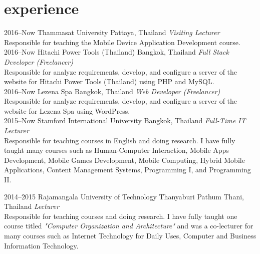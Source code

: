 \documentclass[]{friggeri-cv} %
\begin{document}

\section{experience}

\begin{entrylist}
\entry
{2016--Now}
{Thammasat University}
{Pattaya, Thailand}
{\emph{Visiting Lecturer} \\
Responsible for teaching the Mobile Device Application Development course. \\
}
\entry
{2016--Now}
{Hitachi Power Tools (Thailand)}
{Bangkok, Thailand}
{\emph{Full Stack Developer (Freelancer)} \\
Responsible for analyze requirements, develop, and configure a server of the website for Hitachi Power Tools (Thailand) using PHP and MySQL.\\
}
\entry
{2016--Now}
{Lezena Spa}
{Bangkok, Thailand}
{\emph{Web Developer (Freelancer)} \\
Responsible for analyze requirements, develop, and configure a server of the website for Lezena Spa using WordPress.\\
}
\entry
{2015--Now}
{Stamford International University}
{Bangkok, Thailand}
{\emph{Full-Time IT Lecturer} \\
Responsible for teaching courses in English and doing research. I have fully taught many courses such as Human-Computer Interaction, Mobile Apps Development, Mobile Games Development, Mobile Computing, Hybrid Mobile Applications, Content Management Systems, Programming I, and Programming II.\\
}

\entry
{2014--2015}
{Rajamangala University of Technology Thanyaburi}
{Pathum Thani, Thailand}
{\emph{Lecturer} \\
Responsible for teaching courses and doing research. I have fully taught one course titled \emph{"Computer Organization and Architecture"} and was a co-lecturer for many courses such as Internet Technology for Daily Uses, Computer and Business Information Technology. \\
}
\end{entrylist}
\end{document}
